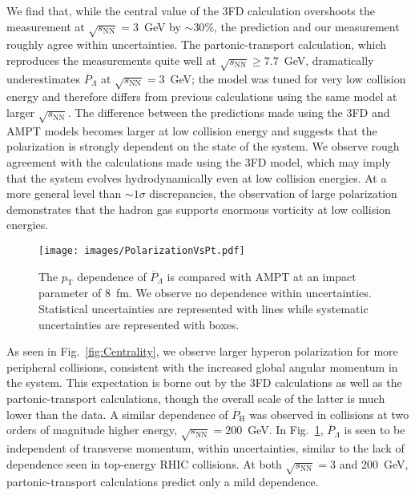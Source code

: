 \documentclass[
  reprint,
  superscriptaddress,
  amsmath,
  amssymb,
  aps,
  floatfix,
]{revtex4-2}
\newcommand{\sNN}{\sqrt{s_\mathrm{NN}}}
\newcommand{\pT}{p_\mathrm{T}}
\newcommand{\PLambda}{\overline{P}_{\Lambda}}
\newcommand{\PHyper}{\overline{P}_\mathrm{H}}
\begin{document}
We find that, while the central value of the 
 3FD calculation\cite{Ivanov:2020udj}
 overshoots the measurement
 at $\sNN=3$~GeV by $\sim30\%$, 
 the prediction and our measurement 
 roughly agree within uncertainties.
 The partonic-transport
 calculation\cite{guo2021locating}, which reproduces the measurements quite
 well at $\sNN\geq7.7$~GeV, dramatically underestimates $\PLambda$
 at $\sNN=3$~GeV; the model was tuned
 for very low collision energy and
 therefore differs from previous calculations using
 the same model at larger $\sNN$\cite{Wei:2018zfb,Li:2017slc,Shi:2017wpk}.
 The difference between the predictions
 made using the 3FD and
 AMPT models becomes larger at
 low collision energy and suggests
 that the polarization is strongly
 dependent on the state of
 the system. We observe rough
 agreement with the calculations made
 using the 3FD model, which
 may imply that the system
 evolves hydrodynamically even at low
 collision energies.
 At a more general level than $\sim1\sigma$
 discrepancies, the observation of large polarization
 demonstrates that the hadron gas supports
 enormous vorticity at low collision energies.

\begin{figure}[t]
  \centering
  \texttt{[image: images/PolarizationVsPt.pdf]}
  \caption{The $\pT$ dependence of $\PLambda$
 is compared with AMPT\cite{guo2021locating} at an
 impact parameter of 8~fm. We
 observe no dependence within uncertainties. Statistical
 uncertainties are represented with lines while
 systematic uncertainties are represented with boxes.}
  \label{fig:Pt}
\end{figure}  

As seen in Fig.~\ref{fig:Centrality}, we observe
 larger hyperon  polarization for more
 peripheral collisions, consistent with the increased
 global angular momentum in the system\cite{Jiang:2016woz}.
 This expectation is borne out by
 the 3FD calculations as well as
 the partonic-transport calculations,
 though the overall scale of the
 latter is much lower than the
 data. A similar dependence of $\PHyper$
 was observed in collisions at two
 orders of magnitude higher energy, $\sNN=200$~GeV\cite{Adam:2018ivw}.
 In Fig.~\ref{fig:Pt}, $\PLambda$ is seen to
 be independent of transverse momentum, within
 uncertainties, similar to the lack of
 dependence seen in top-energy RHIC collisions\cite{Adam:2018ivw}.
 At both $\sNN=3$ and 200~GeV\cite{Adam:2018ivw}, 
 partonic-transport calculations predict only a mild
 dependence.
\end{document}

